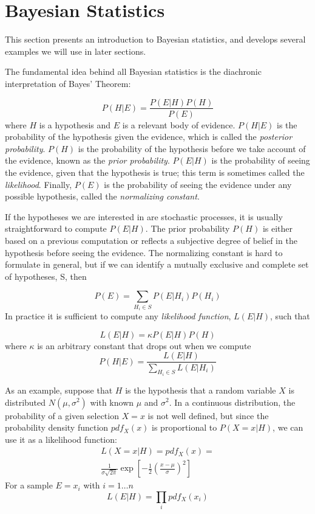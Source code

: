 \documentclass[twocolumn,11pt]{article}
\begin{document}
\section{Bayesian Statistics}
\label{bayes}

This section presents an introduction to Bayesian statistics, and
develops several examples we will use in later sections.

The fundamental idea behind all Bayesian statistics is the
diachronic interpretation of Bayes' Theorem:

\begin{equation}
P(H|E) = \frac{P(E|H) P(H)}{P(E)}
\label{bayeseq}
\end{equation}
%
where $H$ is a hypothesis and $E$ is a relevant body of evidence.
$P(H|E)$ is the probability of the hypothesis given the evidence,
which is called the {\em posterior probability}.  $P(H)$ is the
probability of the hypothesis before we take account of the
evidence, known as the {\em prior probability}.  $P(E|H)$ is the
probability of seeing the evidence, given that the hypothesis
is true; this term is sometimes called the {\em likelihood}.
Finally, $P(E)$ is the probability of seeing the evidence under
any possible hypothesis, called the {\em normalizing constant}.

If the hypotheses we are interested in are stochastic
processes, it is usually straightforward to compute $P(E|H)$.  The
prior probability $P(H)$ is either based on a previous computation or
reflects a subjective degree of belief in the hypothesis before seeing
the evidence.  The normalizing constant is hard to formulate in general,
but if we can identify a mutually exclusive and complete set of
hypotheses, S, then

\begin{equation}
P(E) = \sum_{H_i \in S} P(E|H_i) P(H_i)
\end{equation}
%
In practice it is sufficient to compute any {\em likelihood function},
$L(E|H)$, such that

\begin{equation}
L(E|H) = \kappa P(E|H) P(H)
\end{equation}
%
where $\kappa$ is an arbitrary constant that drops out when we
compute
%
\begin{equation}
P(H|E) = \frac{L(E|H)}{\sum_{H_i \in S} L(E|H_i)}
\end{equation}

As an example, suppose that $H$ is the hypothesis that a random
variable $X$ is distributed $N(\mu,\sigma^2)$ with known $\mu$ and
$\sigma^2$.  
In a continuous distribution, the probability of a given selection
$X=x$ is not well defined, but since the probability density function
$pdf_X(x)$ is proportional to $P(X=x|H)$, we can use it as a
likelihood function:
%
\begin{multline}
L(X=x|H) = pdf_X(x) =\\
         \frac{1}{\sigma \sqrt{2 \pi}} 
\exp \left[ -\frac{1}{2} \left( \frac{x - \mu}{\sigma} \right) ^2 \right]
\end{multline}
%
For a sample $E = x_i$ with $i = 1 \ldots n$
%
\begin{equation}
L(E|H) = \prod_i pdf_X(x_i)
\end{equation}
%
\end{document}
